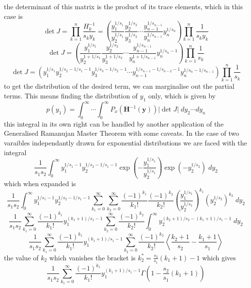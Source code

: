 \documentclass[journal=jcisd8,manuscript=article,layout=onecolumn,pdftex,floatfix,amsmath,amssymb,10pt]{achemso}
\begin{document}
the determinant of this matrix is the product of its trace elements, which in this case is
\begin{equation}
\det J = \prod_{k=1}^n \frac{H_k^{-1}}{s_k y_k} = \left(\frac{y_1^{1/s_1}}{y_2^{1/s_1}}\frac{y_2^{1/s_2}}{y_3^{1/s_2}}\cdots\frac{y_{n-1}^{1/s_{n-1}}}{y_n^{1/s_{n-1}}}y_{n}^{1/s_n}\right) \prod_{k=1}^n \frac{1}{s_k y_k}
\end{equation}
\begin{equation}
\det J = \left(\frac{y_1^{1/s_1}}{y_2^{1+1/s_1}}\frac{y_2^{1/s_2}}{y_3^{1+1/s_2}}\cdots\frac{y_{n-1}^{1/s_{n-1}}}{y_n^{1+1/s_{n-1}}}y_{n}^{1/s_n-1}\right) \prod_{k=1}^n \frac{1}{s_k}
\end{equation}
\begin{equation}
\det J = \left(y_1^{1/s_1} y_2^{1/s_2-1/s_1-1}y_3^{1/s_3-1/s_2-1} \cdots y_{n-1}^{1/s_{n-1}-1/s_{n-2}-1} y_n^{1/s_n - 1/s_{n-1}}\right) \prod_{k=1}^n \frac{1}{s_k}
\end{equation}
to get the distribution of the desired term, we can marginalise out the partial terms. This means finding the distribution of $y_1$ only, which is given by
\begin{equation}
p(y_1) = \int_0^\infty \cdots \int_0^\infty P_x(\mathbf{H}^{-1}(\mathbf{y}))\left | \det J \right | \; dy_2 \cdots dy_n
\end{equation}
this integral in its own right can be handled by another application of the Generalised Ramanujan Master Theorem with some caveats. In the case of two varaibles independantly drawn for exponential distributions we are faced with the integral \begin{equation}
\frac{1}{s_1s_2}\int_0^\infty y_1^{1/s_1 -1} y_2^{1/s_2 - 1/s_1 -1}\exp\left(-\frac{y_1^{1/s_1}}{y_2^{1/s_1}}\right)\exp(-y_2^{1/s_2})\; d y_2
\end{equation}
which when expanded is
\begin{equation}
\frac{1}{s_1s_2}\int_0^\infty y_1^{1/s_1 -1} y_2^{1/s_2 - 1/s_1 -1} \sum_{k_1=0}^\infty \sum_{k_2=0}^\infty \frac{(-1)^{k_1}}{k_1!} \frac{(-1)^{k_2}}{k_2!}(\frac{y_1^{1/s_1}}{y_2^{1/s_1}})^{k_1}(y_2^{1/s_2})^{k_2} \; d y_2
\end{equation}
\begin{equation}
\frac{1}{s_1s_2} \sum_{k_1=0}^\infty \frac{(-1)^{k_1}}{k_1!} y_1^{(k_1+1)/s_1 - 1} \sum_{k_2=0}^\infty  \frac{(-1)^{k_2}}{k_2!} \int_0^\infty y_2^{(k_2+1)/s_2 -(k_1+1)/s_1 -1}\; d y_2
\end{equation}
\begin{equation}
\frac{1}{s_1s_2} \sum_{k_1=0}^\infty \frac{(-1)^{k_1}}{k_1!} y_1^{(k_1+1)/s_1 - 1} \sum_{k_2=0}^\infty  \frac{(-1)^{k_2}}{k_2!} \left\langle \frac{k_2+1}{s_2} - \frac{k_1+1}{s_1}\right\rangle
\end{equation}
the value of $k_2$ which vanishes the bracket is $k_2^* = \frac{s_2}{s_1}(k_1+1)-1$ which gives
\begin{equation}
\frac{1}{s_1s_2} \sum_{k_1=0}^\infty \frac{(-1)^{k_1}}{k_1!} y_1^{(k_1+1)/s_1 - 1} \Gamma\left(1 - \frac{s_2}{s_1}(k_1+1)\right)
\end{equation}
\end{document}
